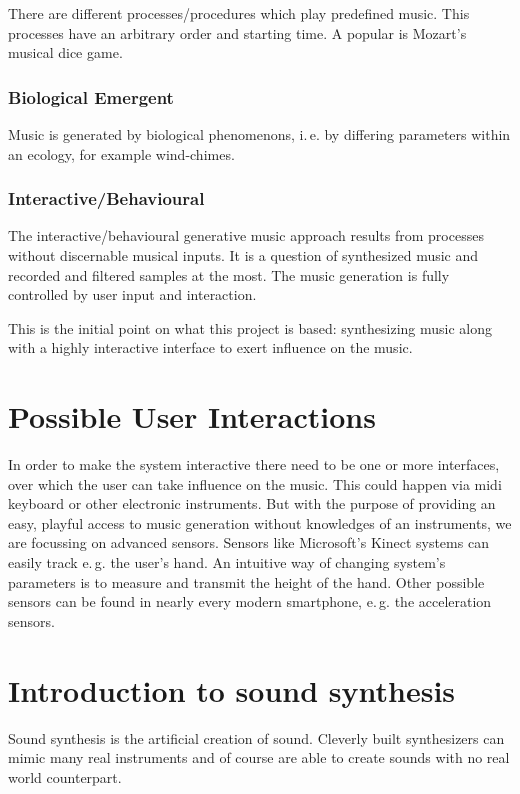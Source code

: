 	There are different processes/procedures which play predefined music. This processes have an arbitrary order and starting time. A popular is Mozart's musical dice game. 

	\subsubsection{Biological Emergent}

	Music is generated by biological phenomenons, i.\,e. by differing parameters within an ecology, for example wind-chimes.

	\subsubsection{Interactive/Behavioural}

	The interactive/behavioural generative music approach results from processes without discernable musical inputs. It is a question of synthesized music and recorded and filtered samples at the most. The music generation is fully controlled by user input and interaction.
	
	This is the initial point on what this project is based: synthesizing music along with a highly interactive interface to exert influence on the music.

	\section{Possible User Interactions}
	In order to make the system interactive there need to be one or more interfaces, over which the user can take influence on the music. This could happen via midi keyboard or other electronic instruments. But with the purpose of providing an easy, playful access to music generation without knowledges of an instruments, we are focussing on advanced sensors. Sensors like Microsoft's Kinect systems can easily track e.\,g. the user's hand. An intuitive way of changing system's parameters is to measure and transmit the height of the hand. Other possible sensors can be found in nearly every modern smartphone, e.\,g. the acceleration sensors.
	
			
				
	\section{Introduction to sound synthesis}
		Sound synthesis is the artificial creation of sound. 
		Cleverly built synthesizers can mimic many real instruments 
		and of course are able to create sounds with no real world counterpart.
		
